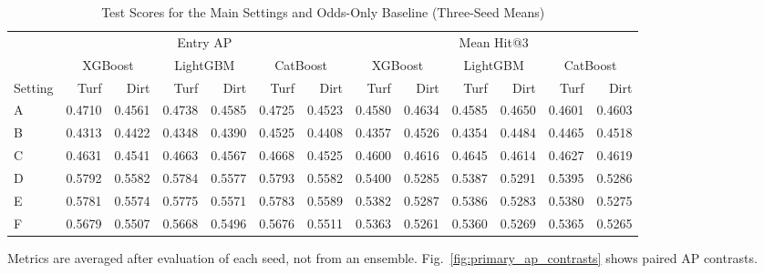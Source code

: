 \begin{table}[!t]
\caption{Test Scores for the Main Settings and Odds-Only Baseline (Three-Seed Means)}
\label{tab:locked_summary}
\centering\footnotesize
\setlength{\tabcolsep}{5pt}\renewcommand{\arraystretch}{1.08}
\begin{tabular}{lrrrrrr|rrrrrr}
\hline
 & \multicolumn{6}{c|}{Entry AP} & \multicolumn{6}{c}{Mean Hit@3} \\
 & \multicolumn{2}{c}{XGBoost} & \multicolumn{2}{c}{LightGBM} & \multicolumn{2}{c|}{CatBoost} & \multicolumn{2}{c}{XGBoost} & \multicolumn{2}{c}{LightGBM} & \multicolumn{2}{c}{CatBoost} \\
Setting & Turf & Dirt & Turf & Dirt & Turf & Dirt & Turf & Dirt & Turf & Dirt & Turf & Dirt \\
\hline
A & 0.4710 & 0.4561 & 0.4738 & 0.4585 & 0.4725 & 0.4523 & 0.4580 & 0.4634 & 0.4585 & 0.4650 & 0.4601 & 0.4603 \\
B & 0.4313 & 0.4422 & 0.4348 & 0.4390 & 0.4525 & 0.4408 & 0.4357 & 0.4526 & 0.4354 & 0.4484 & 0.4465 & 0.4518 \\
C & 0.4631 & 0.4541 & 0.4663 & 0.4567 & 0.4668 & 0.4525 & 0.4600 & 0.4616 & 0.4645 & 0.4614 & 0.4627 & 0.4619 \\
D & 0.5792 & 0.5582 & 0.5784 & 0.5577 & 0.5793 & 0.5582 & 0.5400 & 0.5285 & 0.5387 & 0.5291 & 0.5395 & 0.5286 \\
E & 0.5781 & 0.5574 & 0.5775 & 0.5571 & 0.5783 & 0.5589 & 0.5382 & 0.5287 & 0.5386 & 0.5283 & 0.5380 & 0.5275 \\
F & 0.5679 & 0.5507 & 0.5668 & 0.5496 & 0.5676 & 0.5511 & 0.5363 & 0.5261 & 0.5360 & 0.5269 & 0.5365 & 0.5265 \\
\hline
\end{tabular}
\par\smallskip\footnotesize Metrics are averaged after evaluation of each seed, not from an ensemble. Fig.~\ref{fig:primary_ap_contrasts} shows paired AP contrasts.
\end{table}
